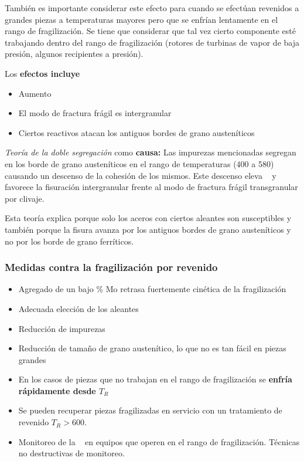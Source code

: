 También es importante considerar este efecto para cuando se efectúan revenidos a grandes piezas a temperaturas mayores pero que se enfrían lentamente en el rango de fragilización. Se tiene que considerar que tal vez cierto componente esté trabajando dentro del rango de fragilización (rotores de turbinas de vapor de baja presión, algunos recipientes a presión).

Los \textbf{efectos incluye}
\begin{itemize}
    \item Aumento \Tdf~
    \item El modo de fractura frágil es intergranular
    \item Ciertos reactivos atacan los antiguos bordes de grano austeníticos
\end{itemize}

\textit{Teoría de la doble segregación} como \textbf{causa:} Las impurezas mencionadas segregan en los borde de grano austeníticos en el rango de temperaturas (400 a 580\grad) causando un descenso de la cohesión de los mismos. Este descenso eleva \Tdf~ y favorece la fisuración intergranular frente al modo de fractura frágil transgranular por clivaje. 

Esta teoría explica porque solo los aceros con ciertos aleantes son susceptibles y también porque la fisura avanza por los antiguos bordes de grano austeníticos y no por los borde de grano ferríticos.


\subsubsection{Medidas contra la fragilización por revenido}

\begin{itemize}
    \item Agregado de un bajo \% Mo retrasa fuertemente cinética de la fragilización
    \item Adecuada elección de los aleantes
    \item Reducción de impurezas
    \item Reducción de tamaño de grano austenítico, lo que no es tan fácil en piezas grandes
    \item En los casos de piezas que no trabajan en el rango de fragilización se \textbf{enfría rápidamente desde $T_R$}
    \item Se pueden recuperar piezas fragilizadas en servicio con un tratamiento de revenido $T_R>600$\grad.
    \item Monitoreo de la \Tdf~ en equipos que operen en el rango de fragilización. Técnicas no destructivas de monitoreo.
\end{itemize}

